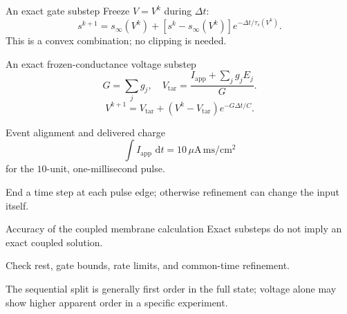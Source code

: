 \documentclass[aspectratio=169,11pt]{beamer}
\providecommand{\dd}{\,\mathrm{d}}\providecommand{\R}{\mathbb{R}}
\newcommand{\notestarget}{notes.pdf}\newcommand{\noteslabel}{Notes}
\begin{document}
\renewcommand{\notestarget}{notes.pdf\#note-gate-preserving-integration-of-the-coupled-system}
\begin{frame}[t,fragile,label=slide-an-exact-gate-substep]{An exact gate substep}
Freeze $V=V^k$ during $\Delta t$:\[s^{k+1}=s_\infty(V^k)+[s^k-s_\infty(V^k)]e^{-\Delta t/\tau_s(V^k)}.\]\pause{} This is a convex combination; no clipping is needed.
\end{frame}
\renewcommand{\notestarget}{notes.pdf\#note-gate-preserving-integration-of-the-coupled-system}
\begin{frame}[t,fragile,label=slide-an-exact-frozen-conductance-voltage-substep]{An exact frozen-conductance voltage substep}
\[G=\sum_jg_j,\quad V_{\mathrm{tar}}=\frac{I_{\mathrm{app}}+\sum_jg_jE_j}{G}.\]\pause{}\[V^{k+1}=V_{\mathrm{tar}}+(V^k-V_{\mathrm{tar}})e^{-G\Delta t/C}.\]
\end{frame}
\renewcommand{\notestarget}{notes.pdf\#note-gate-preserving-integration-of-the-coupled-system}
\begin{frame}[t,fragile,label=slide-event-alignment-and-delivered-charge]{Event alignment and delivered charge}
\[\int I_{\mathrm{app}}\,\dd t=10\,\mu\mathrm A\,\mathrm{ms}/\mathrm{cm}^2\] for the $10$-unit, one-millisecond pulse.\pause{}\par\medskip End a time step at each pulse edge; otherwise refinement can change the input itself.
\end{frame}
\renewcommand{\notestarget}{notes.pdf\#note-gate-preserving-integration-of-the-coupled-system}
\begin{frame}[t,fragile,label=slide-accuracy-of-the-coupled-membrane-calculation]{Accuracy of the coupled membrane calculation}
Exact substeps do not imply an exact coupled solution.\pause{}\par\medskip Check rest, gate bounds, rate limits, and common-time refinement.\par\medskip The sequential split is generally first order in the full state; voltage alone may show higher apparent order in a specific experiment.
\end{frame}
\end{document}
